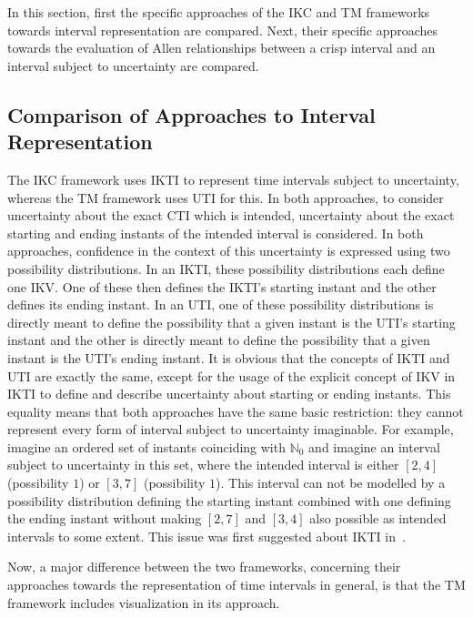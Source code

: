 In this section, first the specific approaches of the IKC and TM frameworks towards interval representation are compared. Next, their specific approaches towards the evaluation of Allen relationships between a crisp interval and an interval subject to uncertainty are compared.

\subsection{\label{subsec:comp-interval}Comparison of Approaches to Interval Representation}
The IKC framework uses IKTI to represent time intervals subject to uncertainty, whereas the TM framework uses UTI for this. In both approaches, to consider uncertainty about the exact CTI which is intended, uncertainty about the exact starting and ending instants of the intended interval is considered. In both approaches, confidence in the context of this uncertainty is expressed using two possibility distributions. In an IKTI, these possibility distributions each define one IKV. One of these then defines the IKTI's starting instant and the other defines its ending instant. In an UTI, one of these possibility distributions is directly meant to define the possibility that a given instant is the UTI's starting instant and the other is directly meant to define the possibility that a given instant is the UTI's ending instant. It is obvious that the concepts of IKTI and UTI are exactly the same, except for the usage of the explicit concept of IKV in IKTI to define and describe uncertainty about starting or ending instants. This equality means that both approaches have the same basic restriction: they cannot represent every form of interval subject to uncertainty imaginable. For example, imagine an ordered set of instants coinciding with $\mathbb{N}_0$ and imagine an interval subject to uncertainty in this set, where the intended interval is either $\left[2, 4\right]$ (possibility $1$) or $\left[3, 7\right]$ (possibility $1$). This interval can not be modelled by a possibility distribution defining the starting instant combined with one defining the ending instant without making $\left[2, 7\right]$ and $\left[3, 4\right]$ also possible as intended intervals to some extent. This issue was first suggested about IKTI in~\cite{Billiet2012}.

Now, a major difference between the two frameworks, concerning their approaches towards the representation of time intervals in general, is that the TM framework includes visualization in its approach.

